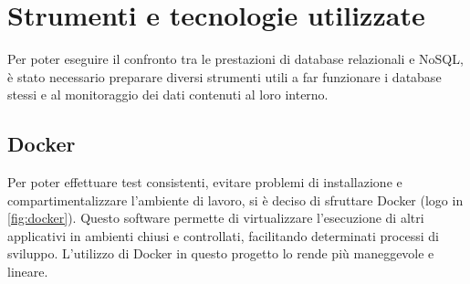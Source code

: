 
\chapter{Strumenti e tecnologie utilizzate}
\label{cap:strumenti}


Per poter eseguire il confronto tra le prestazioni di database relazionali e NoSQL, è stato necessario preparare diversi strumenti utili a far funzionare i database stessi e al monitoraggio dei dati contenuti al loro interno.

\section{Docker}
Per poter effettuare test consistenti, evitare problemi di installazione e compartimentalizzare l'ambiente di lavoro, si è deciso di sfruttare Docker\cite{site:docker}\cite{site:dockerdocs} (logo in \autoref{fig:docker}). Questo software permette di virtualizzare l'esecuzione di altri applicativi in ambienti chiusi e controllati, facilitando determinati processi di sviluppo. L'utilizzo di Docker in questo progetto lo rende più maneggevole e lineare.\\

